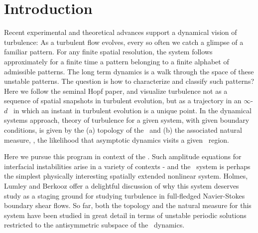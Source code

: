 %

\section{Introduction}

Recent experimental and theoretical advances
support a dynamical vision
of turbulence:
As a turbulent flow evolves,
every so often we catch a glimpse of a familiar pattern.
For any finite  spatial resolution,
the system follows approximately for a finite time 
a pattern belonging to a 
{ finite alphabet}
of admissible patterns.
The long term dynamics is
a {  walk through the space of these unstable patterns}.
The question is how to characterize and classify such patterns?
Here we follow the seminal Hopf paper, and  visualize
turbulence not as  a sequence of 
spatial snapshots in turbulent evolution,
but as a trajectory in an 
 $\infty$-$d$ \statesp\ in which an
instant in turbulent evolution is
a { unique} point. In the dynamical systems approach,  
theory of turbulence for a given system, with given boundary conditions,
is given by the
(a) topology of the \statesp\ and (b) the associated natural measure, 
\ie,
the likelihood that asymptotic dynamics visits a given \statesp\ region.

Here we pursue this program in context of
the \KSe{}.
Such 
amplitude equations for interfacial instabilities arise in a variety
of contexts - and 
the \KS\ system is perhaps the
simplest physically interesting spatially extended nonlinear system.
Holmes, Lumley
and Berkooz offer a delightful discussion of why this system
deserves study as a staging ground for studying turbulence in 
full-fledged Navier-Stokes boundary shear flows. 
So far, both the topology and the natural measure for
this system have been studied in great detail%
in terms of unstable periodic solutions
restricted to
the antisymmetric subspace of the \KS\ dynamics.

